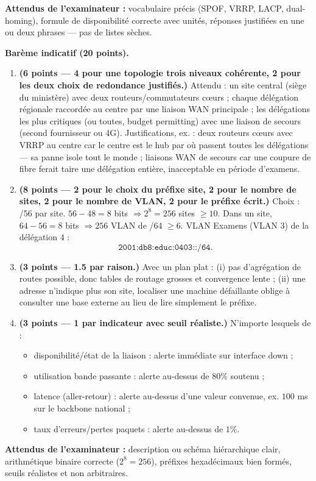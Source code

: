\documentclass[11pt]{article}
\begin{document}
\begin{corrige}
\begin{enumerate}
\end{enumerate}
\textbf{Attendus de l'examinateur :} vocabulaire précis (SPOF, VRRP, LACP, dual-homing), formule de disponibilité correcte avec unités, réponses justifiées en une ou deux phrases --- pas de listes sèches.
\end{corrige}

\begin{corrige}
\textbf{Barème indicatif (20 points).}
\begin{enumerate}
\item \textbf{(6 points --- 4 pour une topologie trois niveaux cohérente, 2 pour les deux choix de redondance justifiés.)} Attendu : un site central (siège du ministère) avec deux routeurs/commutateurs cœurs ; chaque délégation régionale raccordée au centre par une liaison WAN principale ; les délégations les plus critiques (ou toutes, budget permitting) avec une liaison de secours (second fournisseur ou 4G). Justifications, ex. : deux routeurs cœurs avec VRRP au centre car le centre est le hub par où passent toutes les délégations --- sa panne isole tout le monde ; liaisons WAN de secours car une coupure de fibre ferait taire une délégation entière, inacceptable en période d'examens.
\item \textbf{(8 points --- 2 pour le choix du préfixe site, 2 pour le nombre de sites, 2 pour le nombre de VLAN, 2 pour le préfixe écrit.)} Choix : /56 par site. $56 - 48 = 8$ bits $\Rightarrow 2^8 = 256$ sites $\geq 10$. Dans un site, $64 - 56 = 8$ bits $\Rightarrow 256$ VLAN de /64 $\geq 6$. VLAN Examens (VLAN $3$) de la délégation $4$ :
\[ \texttt{2001:db8:educ:0403::/64}. \]
\item \textbf{(3 points --- 1.5 par raison.)} Avec un plan plat : (i) pas d'agrégation de routes possible, donc tables de routage grosses et convergence lente ; (ii) une adresse n'indique plus son site, localiser une machine défaillante oblige à consulter une base externe au lieu de lire simplement le préfixe.
\item \textbf{(3 points --- 1 par indicateur avec seuil réaliste.)} N'importe lesquels de :
\begin{itemize}
\item disponibilité/état de la liaison : alerte immédiate sur interface down ;
\item utilisation bande passante : alerte au-dessus de $80\%$ soutenu ;
\item latence (aller-retour) : alerte au-dessus d'une valeur convenue, ex. $100$ ms sur le backbone national ;
\item taux d'erreurs/pertes paquets : alerte au-dessus de $1\%$.
\end{itemize}
\end{enumerate}
\textbf{Attendus de l'examinateur :} description ou schéma hiérarchique clair, arithmétique binaire correcte ($2^8 = 256$), préfixes hexadécimaux bien formés, seuils réalistes et non arbitraires.
\end{corrige}
\end{document}
